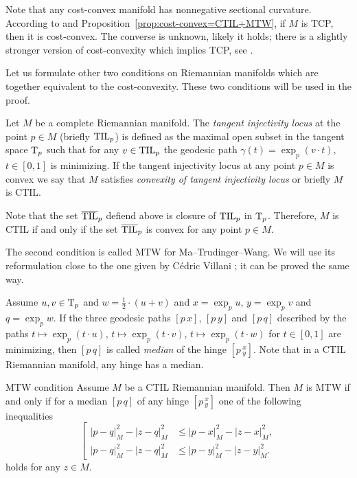 Note that any cost-convex manifold has nonnegative sectional curvature.
According to \cite{FRV-Nec+Suf} and Proposition~\ref{prop:cost-convex=CTIL+MTW}, if $M$ is TCP, then it is cost-convex.
The converse is unknown, likely it holds;
there is a slightly stronger version of cost-convexity which implies TCP, see \cite{FRV-Nec+Suf}.

Let us formulate other two conditions on Riemannian manifolds which are together equivalent to the cost-convexity.
These two conditions will be used in the proof.

Let $M$ be a complete Riemannian manifold.
The \emph{tangent injectivity locus} at the point $p\in M$ (briefly $\mathrm{\rm TIL}_p$) is defined as the maximal open subset in the tangent space $\mathrm{T}_p$ such that for any $v\in\mathrm{\rm TIL}_p$ the geodesic path $\gamma(t)=\exp_p(v\cdot t)$, $t\in [0,1]$ is minimizing.
If the tangent injectivity locus at any point $p\in M$ is convex we say that $M$ satisfies \emph{convexity of  tangent injectivity locus} or briefly $M$ is CTIL.

Note that the set $\overline{\mathrm{\rm TIL}}_p$ defiend above is closure of $\mathrm{\rm TIL}_p$ in $\mathrm{T}_p$.
Therefore, $M$ is CTIL if and only if the set $\overline{\mathrm{\rm TIL}}_p$ is convex for any point $p\in M$.

The second condition is called MTW for Ma--Trudinger--Wang.
We will use its reformulation close to the one given by Cédric Villani \cite[2.6]{MTW+CTIL}; it can be proved the same way.

Assume $u,v\in \mathrm{T}_p$ and $w=\tfrac12\cdot(u+v)$
and $x=\exp_p u$, $y=\exp_pv$ and $q=\exp_pw$.
If the three geodesic paths $[p\,x]$, $[p\,y]$ and $[p\,q]$ described by the paths 
$t\mapsto\exp_p(t\cdot u)$,  $t\mapsto\exp_p(t\cdot v)$, $t\mapsto\exp_p(t\cdot w)$ for $t\in[0,1]$ are minimizing, then $[p\,q]$ is called \emph{median} of the hinge $[p\,^x_y]$.
Note that in a CTIL Riemannian manifold, any hinge has a median.

\begin{thm}{MTW condition}\label{MTW}
Assume $M$ be a CTIL Riemannian manifold. 
Then $M$ is MTW if and only if for a median $[p\,q]$ of any hinge $[p\,^x_y]$ one of the following inequalities
\[
\left[
\begin{aligned}
|p-q|^2_M-|z-q|^2_M&\le |p-x|^2_M-|z-x|^2_M,
\\
|p-q|^2_M-|z-q|^2_M&\le |p-y|^2_M-|z-y|^2_M.
\end{aligned}
\right.
\]
holds for any $z\in M$.
\end{thm}

